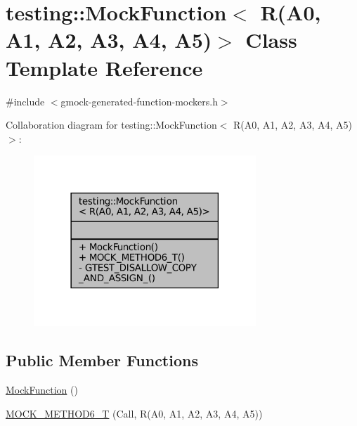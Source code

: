 \hypertarget{classtesting_1_1MockFunction_3_01R_07A0_00_01A1_00_01A2_00_01A3_00_01A4_00_01A5_08_4}{}\section{testing\+:\+:Mock\+Function$<$ R(A0, A1, A2, A3, A4, A5)$>$ Class Template Reference}
\label{classtesting_1_1MockFunction_3_01R_07A0_00_01A1_00_01A2_00_01A3_00_01A4_00_01A5_08_4}


{\ttfamily \#include $<$gmock-\/generated-\/function-\/mockers.\+h$>$}



Collaboration diagram for testing\+:\+:Mock\+Function$<$ R(A0, A1, A2, A3, A4, A5)$>$\+:
\nopagebreak
\begin{figure}[H]
\begin{center}
\leavevmode
\includegraphics[width=237pt]{classtesting_1_1MockFunction_3_01R_07A0_00_01A1_00_01A2_00_01A3_00_01A4_00_01A5_08_4__coll__graph}
\end{center}
\end{figure}
\subsection*{Public Member Functions}
\begin{DoxyCompactItemize}
\item 
\hyperlink{classtesting_1_1MockFunction_3_01R_07A0_00_01A1_00_01A2_00_01A3_00_01A4_00_01A5_08_4_ae3e91041351fafbab8746662cc2fe8d6}{Mock\+Function} ()
\item 
\hyperlink{classtesting_1_1MockFunction_3_01R_07A0_00_01A1_00_01A2_00_01A3_00_01A4_00_01A5_08_4_ae66d20991ea3ab7d2b817c54df80653e}{M\+O\+C\+K\+\_\+\+M\+E\+T\+H\+O\+D6\+\_\+T} (Call, R(A0, A1, A2, A3, A4, A5))
\end{DoxyCompactItemize}
